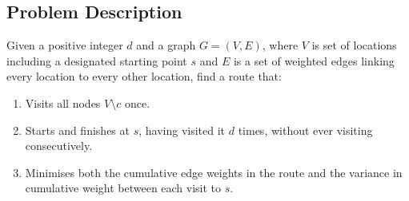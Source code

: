 \subsection{Problem Description}\label{subsec:problem-description}
Given a positive integer $d$ and a graph $G = (V, E)$, where $V$ is set of locations including a designated
starting point $s$ and $E$ is a set of weighted edges linking every location to every other location, find a route
that:
\begin{enumerate}
    \item Visits all nodes $V \setminus c$ once.
    \item Starts and finishes at $s$, having visited it $d$ times, without ever visiting consecutively.
    \item Minimises both the cumulative edge weights in the route and the variance in cumulative weight between
    each visit to $s$.
\end{enumerate}

